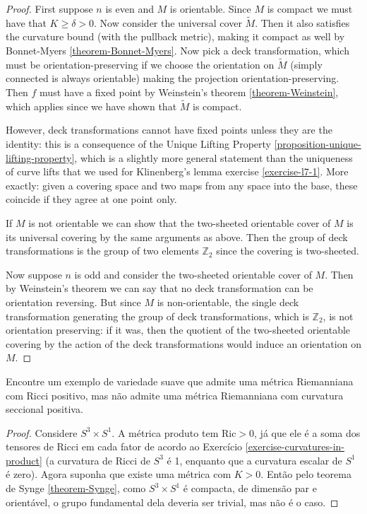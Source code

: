\documentclass{book}
\begin{document}
\begin{proof}
First suppose $n$ is even and $M$ is
orientable. Since $M$ is compact we must
have that $K\geq \delta>0$. Now consider the
universal cover $\tilde{M}$. Then
it also satisfies the curvature bound (with
the pullback metric),
making it compact as well by Bonnet-Myers
\ref{theorem-Bonnet-Myers}.
Now pick a deck transformation, which must be
orientation-preserving if we choose the
orientation on $\tilde{M}$ (simply
connected is always orientable) making the
projection orientation-preserving.
Then $f$ must have a fixed point by
Weinstein's theorem \ref{theorem-Weinstein},
which applies since we have shown that
$\tilde{M}$ is compact.

However, deck transformations cannot have
fixed points unless they are the
identity: this is a consequence of the Unique
Lifting Property
 \ref{proposition-unique-lifting-property},
 which is a
slightly more general statement than the
uniqueness of curve lifts that we
used for Klinenberg's lemma exercise
\ref{exercise-l7-1}.
More exactly: given a covering space and two
maps from any space into the base,
these coincide if they agree at one point
only.

If $M$ is not orientable we can show that the
two-sheeted orientable cover of
$M$ is its universal covering by the same
arguments as above. Then the group of
deck transformations is the group of two
elements $\mathbb{Z}_2$ since the
covering is two-sheeted.

Now suppose $n$ is odd and consider the
two-sheeted orientable cover of $M$.
Then by Weinstein's theorem we can say that
no deck transformation can be
orientation reversing. But since $M$ is
non-orientable, the single deck
transformation generating the group of deck
transformations, which is
$\mathbb{Z}_2$, is not orientation
preserving: if it was, then the quotient of
the two-sheeted orientable covering by the
action of the deck transformations
would induce an orientation on $M$.
\end{proof}

\begin{exercise}
\label{exercise-posit-ricci-but-no-posit}
Encontre um exemplo de variedade suave que
admite uma métrica Riemanniana com
Ricci positivo, mas não admite uma métrica
Riemanniana com curvatura seccional
positiva.
\end{exercise}

\begin{proof}
Considere $S^3\times S^1$. A métrica produto
tem $\text{Ric}>0$, já que ele é a
soma dos tensores de Ricci em cada fator de
acordo ao Exercício
\ref{exercise-curvatures-in-product} (a
curvatura de Ricci de $S^3$ é 1,
enquanto que a curvatura escalar de $S^1$ é
zero). Agora suponha que existe uma
 métrica com $K>0$. Então pelo teorema de
 Synge \ref{theorem-Synge}, como
$S^3\times S^1$ é compacta, de dimensão par e
orientável, o grupo fundamental
dela deveria ser trivial, mas não é o caso.
\end{proof}
\end{document}
